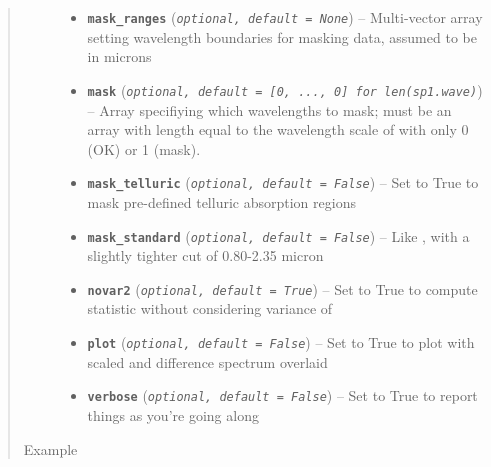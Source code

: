 \documentclass[letterpaper,10pt,english]{sphinxmanual}
\begin{document}
\begin{fulllineitems}
\begin{quote}
\begin{description}
\begin{itemize}
\item {} 
\textbf{\texttt{mask\_ranges}} (\emph{\texttt{optional, default = None}}) -- Multi-vector array setting wavelength boundaries for masking data, assumed to be in microns

\item {} 
\textbf{\texttt{mask}} (\emph{\texttt{optional, default = {[}0, ..., 0{]} for len(sp1.wave)}}) -- Array specifiying which wavelengths to mask; must be an array with length equal to the wavelength scale of  with only 0 (OK) or 1 (mask).

\item {} 
\textbf{\texttt{mask\_telluric}} (\emph{\texttt{optional, default = False}}) -- Set to True to mask pre-defined telluric absorption regions

\item {} 
\textbf{\texttt{mask\_standard}} (\emph{\texttt{optional, default = False}}) -- Like , with a slightly tighter cut of 0.80-2.35 micron

\item {} 
\textbf{\texttt{novar2}} (\emph{\texttt{optional, default = True}}) -- Set to True to compute statistic without considering variance of 

\item {} 
\textbf{\texttt{plot}} (\emph{\texttt{optional, default = False}}) -- Set to True to plot  with scaled  and difference spectrum overlaid

\item {} 
\textbf{\texttt{verbose}} (\emph{\texttt{optional, default = False}}) -- Set to True to report things as you're going along

\end{itemize}

\item[{Example}] \leavevmode
\end{description}\end{quote}


\end{fulllineitems}
\end{document}
